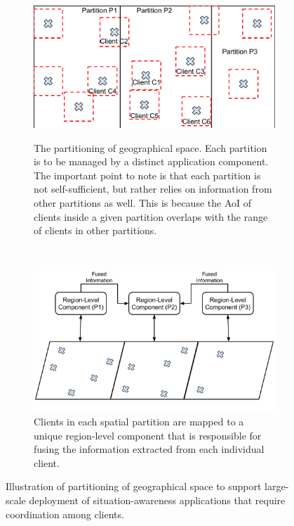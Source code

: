 \begin{figure}
\centering
\begin{subfigure}{0.45\textwidth}
  \centering
  \includegraphics[width=\linewidth]{figures/mechanisms/spatial_ctx_mgmt/aoi_range_partition.pdf}
  \label{fig:aoi_range_partition}
  \caption{The partitioning of geographical space. Each partition is to be managed by a distinct application component. The important point to note is that each partition is not self-sufficient, but rather relies on information from other partitions as well. This is because the AoI of clients inside a given partition overlaps with the range of clients in other partitions.}
\end{subfigure}%
~~~
\begin{subfigure}{0.45\textwidth}
  \centering
  \includegraphics[width=\linewidth]{figures/mechanisms/spatial_ctx_mgmt/aoi_range_partition_mapping.pdf}
  \caption{Clients in each spatial partition are mapped to a unique region-level component that is responsible for fusing the information extracted from each individual client.}
  \label{fig:aoi_range_partition_mapping}
\end{subfigure}
\caption{Illustration of partitioning of geographical space to support large-scale deployment of situation-awareness applications that require coordination among clients.}
\label{fig:spatial_partitioning}
\end{figure}

